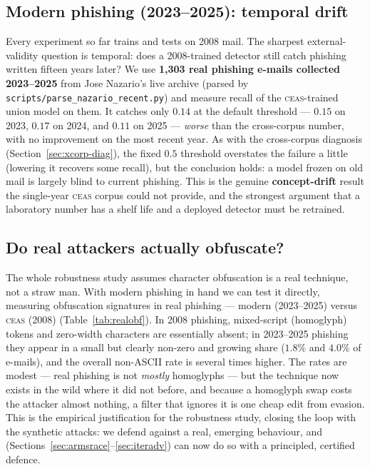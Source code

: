 \documentclass[11pt]{article}
\begin{document}
\subsection{Modern phishing (2023--2025): temporal drift}
\label{sec:drift}
Every experiment so far trains and tests on 2008 mail. The sharpest external-validity
question is temporal: does a 2008-trained detector still catch phishing written fifteen
years later? We use \textbf{1{,}303 real phishing e-mails collected 2023--2025} from Jose
Nazario's live archive (parsed by \texttt{scripts/parse\_nazario\_recent.py}) and measure
recall of the \textsc{ceas}-trained union model on them. It catches only
\textbf{$0.14$} at the default threshold --- $0.15$ on 2023, $0.17$ on 2024, and
$0.11$ on 2025 --- \emph{worse} than the cross-corpus number, with no improvement on the
most recent year. As with the cross-corpus diagnosis (Section~\ref{sec:xcorp-diag}), the
fixed $0.5$ threshold overstates the failure a little (lowering it recovers some recall),
but the conclusion holds: a model frozen on old mail is largely blind to current phishing.
This is the genuine \textbf{concept-drift} result the single-year \textsc{ceas} corpus
could not provide, and the strongest argument that a laboratory number has a shelf life and
a deployed detector must be retrained.

\subsection{Do real attackers actually obfuscate?}
\label{sec:realobf}
The whole robustness study assumes character obfuscation is a real technique, not a straw
man. With modern phishing in hand we can test it directly, measuring obfuscation
signatures in real phishing --- modern (2023--2025) versus \textsc{ceas} (2008)
(Table~\ref{tab:realobf}). In 2008 phishing, mixed-script (homoglyph) tokens and
zero-width characters are essentially absent; in 2023--2025 phishing they appear in a
small but clearly non-zero and growing share ($1.8\%$ and $4.0\%$ of e-mails), and the
overall non-ASCII rate is several times higher. The rates are modest --- real phishing is
not \emph{mostly} homoglyphs --- but the technique now exists in the wild where it did not
before, and because a homoglyph swap costs the attacker almost nothing, a filter that
ignores it is one cheap edit from evasion. This is the empirical justification for the
robustness study, closing the loop with the synthetic attacks: we defend against a real,
emerging behaviour, and (Sections~\ref{sec:armsrace}--\ref{sec:iteradv}) can now do so with
a principled, certified defence.
\end{document}
